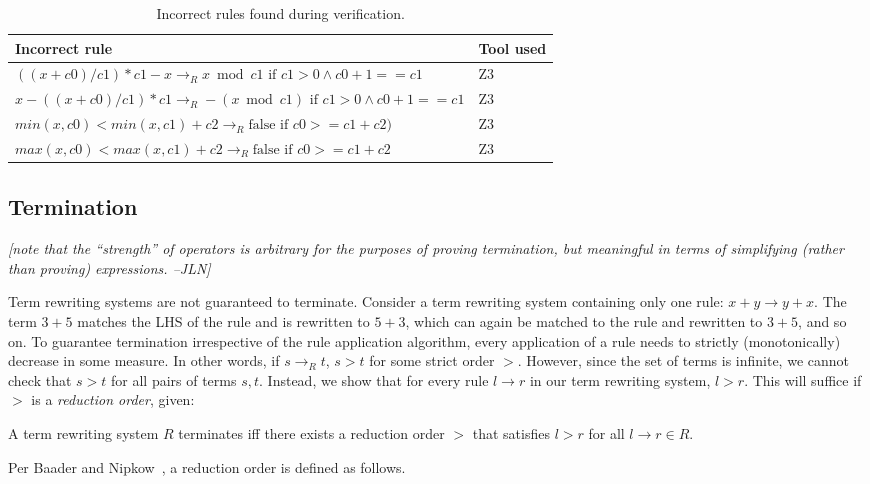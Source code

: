 \documentclass[sigplan,review,anonymous]{acmart}\settopmatter{printfolios=true,printccs=false,printacmref=false}
\newcommand{\jln}[1]{\textcolor{uwpurple}{\textit{[{#1} --JLN]}}}
\begin{document}
\begin{table*}

\caption{Incorrect rules found during verification.}
\begin{tabular}{|l|l|}
\hline
Incorrect rule & Tool used \\
\hline
$((x + c0)/c1)*c1 - x \rightarrow_R x \bmod c1 \textrm{ if } c1 > 0 \wedge c0 + 1 == c1$ & Z3 \\
$x - ((x + c0)/c1)*c1 \rightarrow_R -(x \bmod c1) \textrm{ if } c1 > 0 \wedge c0 + 1 == c1$ & Z3 \\
$min(x, c0) < min(x, c1) + c2 \rightarrow_R \textrm{false if } c0 >= c1 + c2)$ & Z3 \\
$max(x, c0) < max(x, c1) + c2 \rightarrow_R \textrm{false if } c0 >= c1 + c2$ & Z3 \\
\hline
\end{tabular}
\label{tab:incorrectrules}
\end{table*}

\subsection{Termination}

\jln{note that the ``strength'' of operators is arbitrary for the purposes of proving termination, but meaningful in terms of simplifying (rather than proving) expressions.}

Term rewriting systems are not guaranteed to terminate. Consider a term rewriting system containing only one rule: $x + y \rightarrow y + x$. The term $3 + 5$ matches the LHS of the rule and is rewritten to $5 + 3$, which can again be matched to the rule and rewritten to $3 + 5$, and so on. To guarantee termination irrespective of the rule application algorithm, every application of a rule needs to strictly (monotonically) decrease in some measure. In other words, if $s \rightarrow_R t$, $s > t$ for some strict order $>$. However, since the set of terms is infinite, we cannot check that $s > t$ for all pairs of terms $s, t$. Instead, we show that for every rule $l \rightarrow r$ in our term rewriting system, $l > r$. This will suffice if $>$ is a \emph{reduction order}, given:

\begin{theorem}\label{theorem:terminates}
A term rewriting system $R$ terminates iff there exists a reduction order $>$ that satisfies $l > r$ for all $l \rightarrow r \in R$.
\end{theorem}

Per Baader and Nipkow~\cite{baader1999term}, a reduction order is defined as follows.
\end{document}
